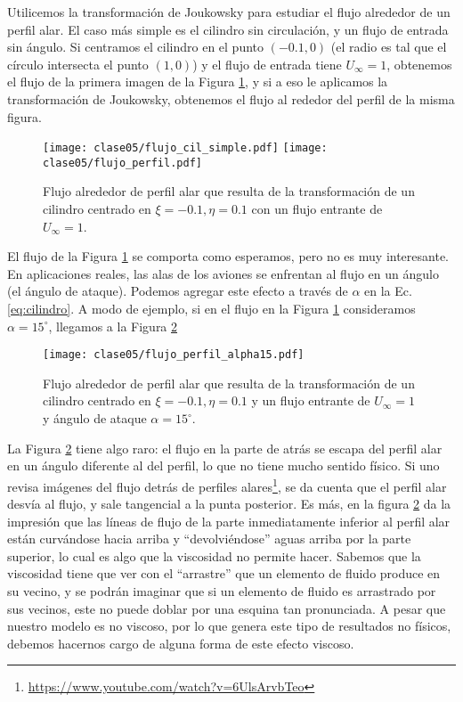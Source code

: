 Utilicemos la transformación de Joukowsky para estudiar el flujo alrededor de un perfil alar.
El caso más simple es el cilindro sin circulación, y un flujo de entrada sin ángulo.
Si centramos el cilindro en el punto $(-0.1,0)$ (el radio es tal que el círculo intersecta el punto $(1,0)$) y el flujo de entrada tiene $U_\infty=1$, obtenemos el flujo de la primera imagen de la Figura \ref{fig:flujo_cil_simple}, y si a eso le aplicamos la transformación de Joukowsky, obtenemos el flujo al rededor del perfil de la misma figura.
%
\begin{figure}[h!]
\centering
\texttt{[image: clase05/flujo\_cil\_simple.pdf]}
\texttt{[image: clase05/flujo\_perfil.pdf]}
\caption{Flujo alrededor de perfil alar que resulta de la transformación de un cilindro centrado en $\xi=-0.1, \eta=0.1$ con un flujo entrante de $U_\infty=1$.}\label{fig:flujo_cil_simple}
\end{figure}

El flujo de la Figura \ref{fig:flujo_cil_simple} se comporta como esperamos, pero no es muy interesante.
En aplicaciones reales, las alas de los aviones se enfrentan al flujo en un ángulo (el ángulo de ataque).
Podemos agregar este efecto a través de $\alpha$ en la Ec. \eqref{eq:cilindro}.
A modo de ejemplo, si en el flujo en la Figura \ref{fig:flujo_cil_simple} consideramos $\alpha=15^\circ$, llegamos a la Figura \ref{fig:flujo_perfil_alpha15} 
%
\begin{figure}[h!]
\centering
\texttt{[image: clase05/flujo\_perfil\_alpha15.pdf]}
\caption{Flujo alrededor de perfil alar que resulta de la transformación de un cilindro centrado en $\xi=-0.1, \eta=0.1$ y un flujo entrante de $U_\infty=1$ y ángulo de ataque $\alpha=15^\circ$.}\label{fig:flujo_perfil_alpha15}
\end{figure}

La Figura \ref{fig:flujo_perfil_alpha15} tiene algo raro: el flujo en la parte de atrás se escapa del perfil alar en un ángulo diferente al del perfil, lo que no tiene mucho sentido físico.
Si uno revisa imágenes del flujo detrás de perfiles alares\footnote{\url{https://www.youtube.com/watch?v=6UlsArvbTeo}}, se da cuenta que el perfil alar desvía al flujo, y sale tangencial a la punta posterior.
Es más, en la figura \ref{fig:flujo_perfil_alpha15} da la impresión que las líneas de flujo de la parte inmediatamente inferior al perfil alar están curvándose hacia arriba y ``devolviéndose'' aguas arriba por la parte superior, lo cual es algo que la viscosidad no permite hacer.
Sabemos que la viscosidad tiene que ver con el ``arrastre'' que un elemento de fluido produce en su vecino, y se podrán imaginar que si un elemento de fluido es arrastrado por sus vecinos, este no puede doblar por una esquina tan pronunciada.
A pesar que nuestro modelo es no viscoso, por lo que genera este tipo de resultados no físicos, debemos hacernos cargo de alguna forma de este efecto viscoso.

